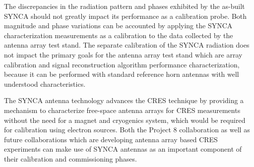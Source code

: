 The discrepancies in the radiation pattern and phases exhibited by the as-built SYNCA should not greatly impact its performance as a calibration probe. Both magnitude and phase variations can be accounted by applying the SYNCA characterization measurements as a calibration to the data collected by the antenna array test stand. The separate calibration of the SYNCA radiation does not impact the primary goals for the antenna array test stand which are array calibration and signal reconstruction algorithm performance characterization, because it can be performed with standard reference horn antennas with well understood characteristics.

The SYNCA antenna technology advances the CRES technique by providing a mechanism to characterize free-space antenna arrays for CRES measurements without the need for a magnet and cryogenics system, which would be required for calibration using electron sources. Both the Project 8 collaboration as well as future collaborations which are developing antenna array based CRES experiments can make use of SYNCA antennas as an important component of their calibration and commissioning phases.



